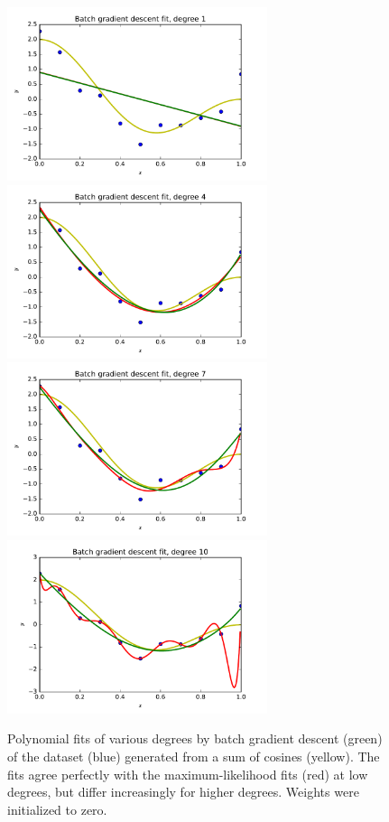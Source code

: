 \documentclass{article}
\begin{document}
\begin{figure}[h]
   \centering
   \includegraphics[width=3in]{img/2-3_bgd_fit_degree1.pdf}
   \includegraphics[width=3in]{img/2-3_bgd_fit_degree4.pdf}
   \includegraphics[width=3in]{img/2-3_bgd_fit_degree7.pdf}
   \includegraphics[width=3in]{img/2-3_bgd_fit_degree10.pdf}
   \caption{Polynomial fits of various degrees by batch gradient descent (green) of the dataset (blue) generated from a sum of cosines (yellow).
   The fits agree perfectly with the maximum-likelihood fits (red) at low degrees, but differ increasingly for higher degrees.
   Weights were initialized to zero.
   }
   \label{fig:bgd-poly-fits}
\end{figure}
\end{document}
